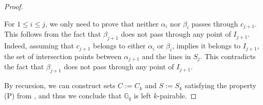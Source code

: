 \documentclass[10pt,a4paper]{article}
\newcommand{\ls}{\leqslant}
\newcommand{\G}[1][q]{\mathbb{G}_{#1}}
\begin{document}
\begin{proof}
\begin{enumerate}
        For $1\ls i \ls j$, we only need to prove that neither $\alpha_i$ nor $\beta_i$ passes through $c_{j+1}$. This follows from the fact that $\beta_{j+1}$ does not pass through any point of $I_{j+1}$. Indeed, assuming that $c_{j+1}$  belongs to either $\alpha_i$ or $\beta_i$, implies it belongs to $I_{j+1}$, the set of intersection points between $\alpha_{j+1}$ and the lines in $S_j$. This  contradicts the fact that $\beta_{j+1}$ does not pass through any point of $I_{j+1}$.
    \end{enumerate}

    \noindent By recursion, we can construct sets $C := C_k$ and $S := S_k$ satisfying the property (P) from , and thus we conclude that $\G$ is left $k$-pairable.
\end{proof}
\end{document}

